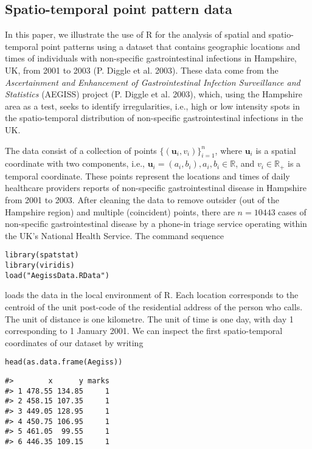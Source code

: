 \hypertarget{spatio-temporal-point-pattern-data}{%
\subsection{Spatio-temporal point pattern data}\label{spatio-temporal-point-pattern-data}}

In this paper, we illustrate the use of R for the analysis of spatial and spatio-temporal point patterns using a dataset that contains geographic locations and times of individuals with non-specific gastrointestinal infections in Hampshire, UK, from 2001 to 2003 (P. Diggle et al. 2003). These data come from the \emph{Ascertainment and Enhancement of Gastrointestinal Infection Surveillance and Statistics} (AEGISS) project (P. Diggle et al. 2003), which, using the Hampshire area as a test, seeks to identify irregularities, i.e., high or low intensity spots in the spatio-temporal distribution of non-specific gastrointestinal infections in the UK.

The data consist of a collection of points \(\{(\mathbf{u}_i,v_i)\}_{i=1}^n\), where \(\mathbf{u}_i\) is a spatial coordinate with two components, i.e., \(\mathbf{u}_i = (a_i, b_i), a_i,b_i \in \mathbb{R}\), and \(v_i\in \mathbb{R}_+\) is a temporal coordinate. These points represent the locations and times of daily healthcare providers reports of non-specific gastrointestinal disease in Hampshire from 2001 to 2003. After cleaning the data to remove outsider (out of the Hampshire region) and multiple (coincident) points, there are \(n = 10443\) cases of non-specific gastrointestinal disease by a phone-in triage service operating within the UK's National Health Service. The command sequence

\begin{verbatim}
library(spatstat)
library(viridis)
load("AegissData.RData")
\end{verbatim}

loads the data in the local environment of R. Each location corresponds to the centroid of the unit post-code of the residential address of the person who calls. The unit of distance is one kilometre. The unit of time is one day, with day 1 corresponding to 1 January 2001. We can inspect the first spatio-temporal coordinates of our dataset by writing

\begin{verbatim}
head(as.data.frame(Aegiss))
\end{verbatim}

\begin{verbatim}
#>        x      y marks
#> 1 478.55 134.85     1
#> 2 458.15 107.35     1
#> 3 449.05 128.95     1
#> 4 450.75 106.95     1
#> 5 461.05  99.55     1
#> 6 446.35 109.15     1
\end{verbatim}

